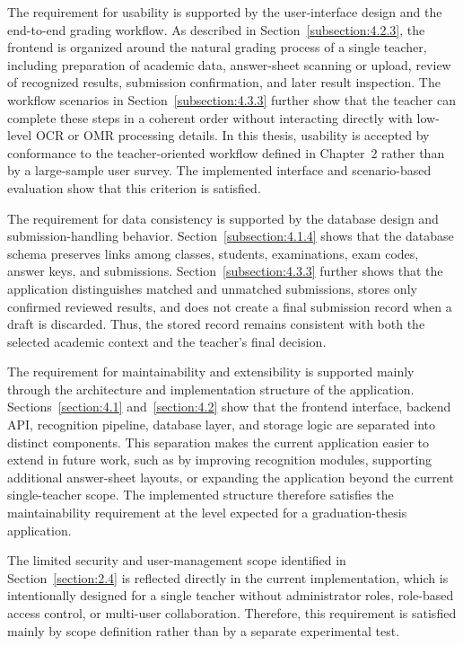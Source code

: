 \documentclass[../Main.tex]{subfiles}
\begin{document}
The requirement for usability is supported by the user-interface design and the
end-to-end grading workflow. As described in Section~\ref{subsection:4.2.3}, the
frontend is organized around the natural grading process of a single teacher,
including preparation of academic data, answer-sheet scanning or upload, review
of recognized results, submission confirmation, and later result inspection. The
workflow scenarios in Section~\ref{subsection:4.3.3} further show that the
teacher can complete these steps in a coherent order without interacting
directly with low-level OCR or OMR processing details. In this thesis,
usability is accepted by conformance to the teacher-oriented workflow defined
in Chapter~2 rather than by a large-sample user survey. The implemented
interface and scenario-based evaluation show that this criterion is satisfied.

The requirement for data consistency is supported by the database design and
submission-handling behavior. Section~\ref{subsection:4.1.4} shows that the
database schema preserves links among classes, students, examinations, exam
codes, answer keys, and submissions. Section~\ref{subsection:4.3.3} further
shows that the application distinguishes matched and unmatched submissions,
stores only confirmed reviewed results, and does not create a final submission
record when a draft is discarded. Thus, the stored record remains consistent
with both the selected academic context and the teacher's final decision.

The requirement for maintainability and extensibility is supported mainly
through the architecture and implementation structure of the application.
Sections~\ref{section:4.1} and~\ref{section:4.2} show that the frontend
interface, backend API, recognition pipeline, database layer, and storage logic
are separated into distinct components. This separation makes the current
application easier to extend in future work, such as by improving recognition
modules, supporting additional answer-sheet layouts, or expanding the
application beyond the current single-teacher scope. The implemented structure
therefore satisfies the maintainability requirement at the level expected for a
graduation-thesis application.

The limited security and user-management scope identified in
Section~\ref{section:2.4} is reflected directly in the current implementation,
which is intentionally designed for a single teacher without administrator
roles, role-based access control, or multi-user collaboration. Therefore, this
requirement is satisfied mainly by scope definition rather than by a separate
experimental test.
\end{document}
